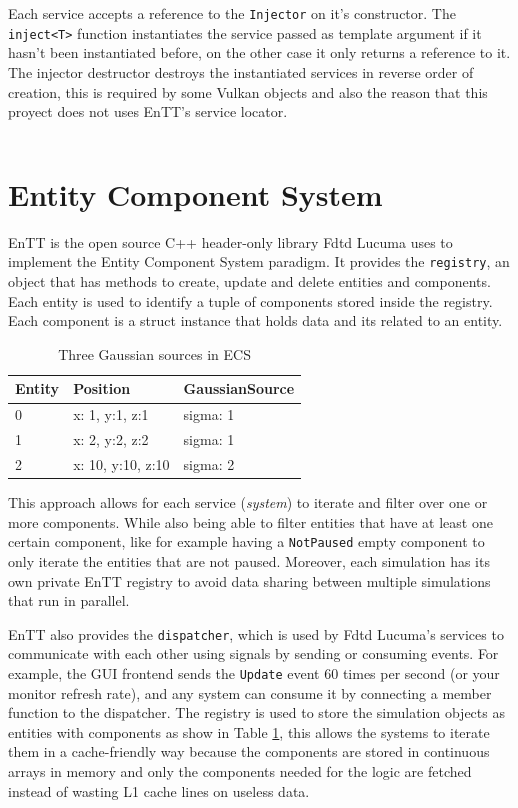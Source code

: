 \documentclass[../main.tex]{subfiles}
\begin{document}
Each service accepts a reference to the \texttt{Injector} on it's constructor.
The \texttt{inject<T>} function instantiates the service passed as template argument if it hasn't been instantiated before, on the other case it only returns a reference to it.
The injector destructor destroys the instantiated services in reverse order of creation, this is required by some Vulkan objects and also the reason that this proyect does not uses EnTT's service locator.

\inputminted[bgcolor=codeBg, tabsize=4, breaklines=true, linenos=true, escapeinside=||]{cpp}{\subfix{service.cpp}}

\section{Entity Component System}
EnTT\cite{entt} is the open source C++ header-only library Fdtd Lucuma uses to implement the Entity Component System paradigm.
It provides the \texttt{registry}, an object that has methods to create, update and delete entities and components.
Each entity is used to identify a tuple of components stored inside the registry.
Each component is a struct instance that holds data and its related to an entity.

\begin{table}[H]
	\centering
	\begin{tabular}{l|l|l}
		Entity & Position & GaussianSource \\
		\hline
		0 & x: 1, y:1, z:1 & sigma: 1 \\
		1 & x: 2, y:2, z:2 & sigma: 1 \\
		2 & x: 10, y:10, z:10 & sigma: 2 \\
	\end{tabular}
	\caption{Three Gaussian sources in ECS}
	\label{tab:ecs_example}
\end{table}

This approach allows for each service (\emph{system}) to iterate and filter over one or more components.
While also being able to filter entities that have at least one certain component, like for example having a \texttt{NotPaused} empty component to only iterate the entities that are not paused.
Moreover, each simulation has its own private EnTT registry to avoid data sharing between multiple simulations that run in parallel.

EnTT also provides the \texttt{dispatcher}, which is used by Fdtd Lucuma's services to communicate with each other using signals by sending or consuming events.
For example, the GUI frontend sends the \texttt{Update} event 60 times per second (or your monitor refresh rate), and any system can consume it by connecting a member function to the dispatcher.
The registry is used to store the simulation objects as entities with components as show in Table \ref{tab:ecs_example}, this allows the systems to iterate them in a cache-friendly way because the components are stored in continuous arrays in memory and only the components needed for the logic are fetched instead of wasting L1 cache lines on useless data\cite{10.1145/3748522.3779910}.
\end{document}
